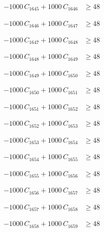 \documentclass[a4paper,11pt]{article}
\begin{document}
\begin{align}
-1000\,C_{1645} + 1000\,C_{1646} &\geq 48 \nonumber
\end{align}

\begin{align}
-1000\,C_{1646} + 1000\,C_{1647} &\geq 48 \nonumber
\end{align}

\begin{align}
-1000\,C_{1647} + 1000\,C_{1648} &\geq 48 \nonumber
\end{align}

\begin{align}
-1000\,C_{1648} + 1000\,C_{1649} &\geq 48 \nonumber
\end{align}

\begin{align}
-1000\,C_{1649} + 1000\,C_{1650} &\geq 48 \nonumber
\end{align}

\begin{align}
-1000\,C_{1650} + 1000\,C_{1651} &\geq 48 \nonumber
\end{align}

\begin{align}
-1000\,C_{1651} + 1000\,C_{1652} &\geq 48 \nonumber
\end{align}

\begin{align}
-1000\,C_{1652} + 1000\,C_{1653} &\geq 48 \nonumber
\end{align}

\begin{align}
-1000\,C_{1653} + 1000\,C_{1654} &\geq 48 \nonumber
\end{align}

\begin{align}
-1000\,C_{1654} + 1000\,C_{1655} &\geq 48 \nonumber
\end{align}

\begin{align}
-1000\,C_{1655} + 1000\,C_{1656} &\geq 48 \nonumber
\end{align}

\begin{align}
-1000\,C_{1656} + 1000\,C_{1657} &\geq 48 \nonumber
\end{align}

\begin{align}
-1000\,C_{1657} + 1000\,C_{1658} &\geq 48 \nonumber
\end{align}

\begin{align}
-1000\,C_{1658} + 1000\,C_{1659} &\geq 48 \nonumber
\end{align}
\end{document}
